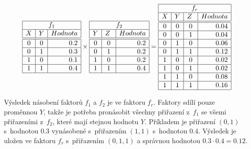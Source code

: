 \begin{table}
\begin{equation*}
\begin{array}{|c|c|r|}
    \hline
    \multicolumn{3}{|c|}{f_1} \\
    \hline
    X & Y & Hodnota \\
    \hline
    \hline
    0 & 0 & 0.2 \\
    \hline
    0 & 1 & 0.3 \\
    \hline
    1 & 0 & 0.1 \\
    \hline
    1 & 1 & 0.4 \\
    \hline
\end{array}
\times
\begin{array}{|c|c|r|}
    \hline
    \multicolumn{3}{|c|}{f_2} \\
    \hline
    Y & Z~& Hodnota \\
    \hline
    \hline
    0 & 0 & 0.2 \\
    \hline
    0 & 1 & 0.2 \\
    \hline
    1 & 0 & 0.2 \\
    \hline
    1 & 1 & 0.4 \\
    \hline
\end{array}
=
\begin{array}{|c|c|c|r|}
    \hline
    \multicolumn{4}{|c|}{f_r} \\
    \hline
    X & Y & Z~& Hodnota \\
    \hline
    \hline
    0 & 0 & 0 & 0.04 \\
    \hline
    0 & 0 & 1 & 0.04 \\
    \hline
    0 & 1 & 0 & 0.06 \\
    \hline
    0 & 1 & 1 & 0.12 \\
    \hline
    1 & 0 & 0 & 0.02 \\
    \hline
    1 & 0 & 1 & 0.02 \\
    \hline
    1 & 1 & 0 & 0.08 \\
    \hline
    1 & 1 & 1 & 0.16\\
    \hline
\end{array}
\end{equation*}
\caption{Příklad násobení dvou faktorů, které sdílí proměnnou.}
\label{tab:facmul}
\end{table}

Výsledek násobení faktorů $f_1$ a $f_2$ je ve faktoru $f_r$.
Faktory sdílí pouze proměnnou $Y$, takže je potřeba pronásobit všechny přiřazení z~$f_1$ se všemi přiřazeními z~$f_2$, které mají stejnou hodnotu $Y$.
Příkladem je přiřazení $(0, 1)$ s~hodnotou $0.3$ vynásobené s~přiřazením $(1, 1)$ s~hodnotou $0.4$.
Výsledek je uložen ve faktoru $f_r$ s~přiřazením $(0, 1, 1)$ a správnou hodnotou $0.3 \cdot 0.4 = 0.12$.

